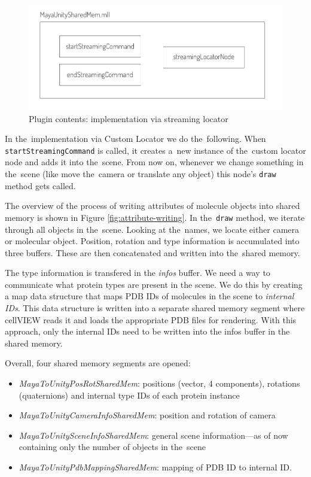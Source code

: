 \documentclass[
  digital, %
  table,   %
  nolof,     %
  nolot,     %
  oneside,
]{fithesis3}
\begin{document}
\begin{figure}
  \centering
  \includegraphics[scale=0.8]{images/plugin-contents.pdf}
  \caption{Plugin contents: implementation via streaming locator}
  \label{fig:plugin-content}
\end{figure}

In the implementation via Custom Locator we do the following. When \texttt{startStreamingCommand} is called, it creates a new instance of the custom locator node and adds it into the scene. From now on, whenever we change something in the scene (like move the camera or translate any object) this node's \texttt{draw} method gets called.

The overview of the process of writing attributes of molecule objects into shared memory is shown in Figure \ref{fig:attribute-writing}. In the \texttt{draw} method, we iterate through all objects in the scene. Looking at the names, we locate either camera or molecular object. Position, rotation and type information is accumulated into three buffers. These are then concatenated and written into the shared memory.

The type information is transfered in the \textit{infos} buffer. We need a way to communicate what protein types are present in the scene. We do this by creating a map data structure that maps PDB IDs of molecules in the scene to \textit{internal IDs}. This data structure is written into a separate shared memory segment where cellVIEW reads it and loads the appropriate PDB files for rendering. With this approach, only the internal IDs need to be written into the infos buffer in the shared memory.

Overall, four shared memory segments are opened:
\begin{itemize}
\item \textit{MayaToUnityPosRotSharedMem}: positions (vector, 4 components), rotations (quaternions) and internal type IDs of each protein instance
\item \textit{MayaToUnityCameraInfoSharedMem}: position and rotation of camera
\item \textit{MayaToUnitySceneInfoSharedMem}: general scene information—as of now containing only the number of objects in the scene
\item \textit{MayaToUnityPdbMappingSharedMem}: mapping of PDB ID to internal ID.
\end{itemize}
\end{document}
